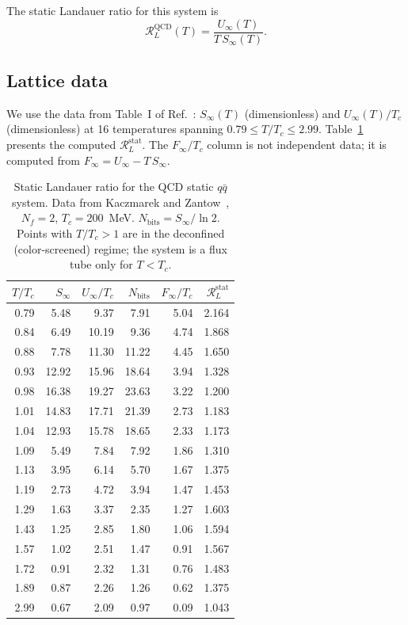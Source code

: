 \documentclass[%
 aip,
 amsmath,amssymb,
 reprint,%
]{revtex4-2}
\newcommand{\RLs}{\mathcal{R}_L^{\mathrm{stat}}}
\begin{document}
The static Landauer ratio for this system is
\begin{equation}
\label{eq:RL_qcd}
\mathcal{R}_L^{\mathrm{QCD}}(T) = \frac{U_{\infty}(T)}{T\,S_{\infty}(T)}.
\end{equation}

\subsection{Lattice data}

We use the data from Table~I of Ref.~\cite{KZ2005a}:
$S_{\infty}(T)$ (dimensionless) and $U_{\infty}(T)/T_c$
(dimensionless) at 16 temperatures spanning $0.79 \leq T/T_c \leq 2.99$.
Table~\ref{tab:qcd_rl} presents the computed $\RLs$.
The $F_{\infty}/T_c$ column is not independent data; it is computed
from $F_{\infty} = U_{\infty} - T\,S_{\infty}$.

\begin{table}[t]
\centering
\caption{Static Landauer ratio for the QCD static $q\bar{q}$ system.
Data from Kaczmarek and Zantow~\cite{KZ2005a}, $N_f = 2$,
$T_c = 200$~MeV.  $N_{\mathrm{bits}} = S_{\infty}/\ln 2$.
Points with $T/T_c > 1$ are in the deconfined (color-screened)
regime; the system is a flux tube only for $T < T_c$.}
\label{tab:qcd_rl}
\begin{tabular}{@{}rrrrrr@{}}
\toprule
$T/T_c$ & $S_{\infty}$ & $U_{\infty}/T_c$ & $N_{\mathrm{bits}}$ &
$F_{\infty}/T_c$ & $\RLs$ \\
\midrule
0.79 &  5.48 &  9.37 &  7.91 & 5.04 & 2.164 \\
0.84 &  6.49 & 10.19 &  9.36 & 4.74 & 1.868 \\
0.88 &  7.78 & 11.30 & 11.22 & 4.45 & 1.650 \\
0.93 & 12.92 & 15.96 & 18.64 & 3.94 & 1.328 \\
0.98 & 16.38 & 19.27 & 23.63 & 3.22 & 1.200 \\
1.01 & 14.83 & 17.71 & 21.39 & 2.73 & 1.183 \\
1.04 & 12.93 & 15.78 & 18.65 & 2.33 & 1.173 \\
1.09 &  5.49 &  7.84 &  7.92 & 1.86 & 1.310 \\
1.13 &  3.95 &  6.14 &  5.70 & 1.67 & 1.375 \\
1.19 &  2.73 &  4.72 &  3.94 & 1.47 & 1.453 \\
1.29 &  1.63 &  3.37 &  2.35 & 1.27 & 1.603 \\
1.43 &  1.25 &  2.85 &  1.80 & 1.06 & 1.594 \\
1.57 &  1.02 &  2.51 &  1.47 & 0.91 & 1.567 \\
1.72 &  0.91 &  2.32 &  1.31 & 0.76 & 1.483 \\
1.89 &  0.87 &  2.26 &  1.26 & 0.62 & 1.375 \\
2.99 &  0.67 &  2.09 &  0.97 & 0.09 & 1.043 \\
\bottomrule
\end{tabular}
\end{table}
\end{document}

